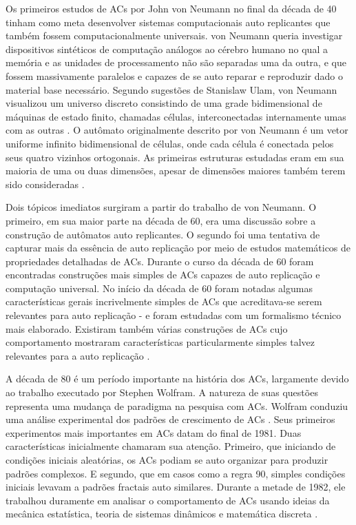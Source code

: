 \documentclass[12pt,a4paper]{article}
\begin{document}
Os primeiros estudos de ACs por John von Neumann no final da década de
40 tinham como meta desenvolver sistemas computacionais auto replicantes que também fossem
computacionalmente universais. von Neumann queria investigar dispositivos sintéticos de
computação análogos ao cérebro humano no qual a memória e as unidades de processamento
não são separadas uma da outra, e que fossem massivamente paralelos e capazes de se
auto reparar e reproduzir dado o material base necessário. Segundo sugestões de
Stanislaw Ulam, von Neumann visualizou um universo discreto consistindo de uma grade
bidimensional de máquinas de estado finito, chamadas células, interconectadas
internamente umas com as outras . O autômato originalmente descrito por
von Neumann é um vetor uniforme infinito bidimensional de células, onde cada célula é
conectada pelos seus quatro vizinhos ortogonais. As primeiras estruturas estudadas eram
em sua maioria de uma ou duas dimensões, apesar de dimensões maiores também terem sido
consideradas .

Dois tópicos imediatos surgiram a partir do trabalho de von Neumann. O primeiro, em
sua maior parte na década de 60, era uma discussão sobre a construção de autômatos
auto replicantes. O segundo foi uma tentativa de capturar mais da essência de
auto replicação por meio de estudos matemáticos de propriedades detalhadas de
ACs. Durante o curso da década de 60 foram encontradas construções
mais simples de ACs capazes de auto replicação e computação
universal. No início da década de 60 foram notadas algumas características gerais
incrivelmente simples de ACs que acreditava-se serem relevantes para
auto replicação - e foram estudadas com um formalismo técnico mais elaborado. Existiram
também várias construções de ACs cujo comportamento mostraram
características particularmente simples talvez relevantes para a auto
replicação .

A década de 80 é um período importante na história dos ACs,
largamente devido ao trabalho executado por Stephen Wolfram. A natureza de suas questões
representa uma mudança de paradigma na pesquisa com ACs. Wolfram conduziu
uma análise experimental dos padrões de crescimento de ACs
. Seus primeiros experimentos mais importantes em ACs
datam do final de 1981. Duas características inicialmente chamaram sua atenção.
Primeiro, que iniciando de condições iniciais aleatórias, os ACs
podiam se auto organizar para produzir padrões complexos. E segundo, que em casos
como a regra 90, simples condições iniciais levavam a padrões fractais auto similares.
Durante a metade de 1982, ele trabalhou duramente em analisar o comportamento de
ACs usando ideias da mecânica estatística, teoria de sistemas
dinâmicos e matemática discreta .
\end{document}

